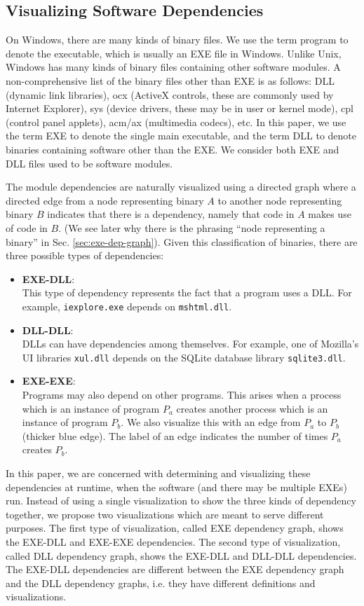 \subsection{Visualizing Software Dependencies}

On Windows, there are many kinds of binary files.
We use the term program to denote the executable, which
is usually an EXE file in Windows.
Unlike Unix, Windows has many kinds of binary files containing 
other software modules.
A non-comprehensive list of the binary files other than EXE
is as follows: 
DLL (dynamic link libraries), ocx (ActiveX controls,
these are commonly used by Internet Explorer), sys (device
drivers, these may be in user or kernel mode), cpl (control panel applets), 
acm/ax (multimedia codecs), etc.
In this paper, we use the term EXE to denote the single main executable,
and the term DLL to denote binaries containing software other than the EXE.
We consider both EXE and DLL files used to be software modules.

The module dependencies are naturally visualized using a directed graph where
a directed edge from a node representing binary $A$ to another 
node representing binary $B$ indicates that there is
a dependency, namely that code in $A$ makes use of code in $B$.
(We see later why there is the phrasing ``node representing a binary'' in
Sec. \ref{sec:exe-dep-graph}).
Given this classification of binaries, there are three possible
types of dependencies:
\begin{itemize}
\item {\bf EXE-DLL}: \\
This type of dependency represents the fact that a program uses a DLL.
For example, {\tt iexplore.exe} depends on {\tt mshtml.dll}.
\item {\bf DLL-DLL}: \\
DLLs can have dependencies among themselves.
For example, one of Mozilla's UI libraries {\tt xul.dll} depends on the SQLite
database library {\tt sqlite3.dll}.
\item {\bf EXE-EXE}: \\
Programs may also depend on other programs. This arises when a process
which is an instance of program $P_a$ creates another process 
which is an instance of program $P_b$.
We also visualize this with an edge from $P_a$ to $P_b$ (thicker blue edge).
The label of an edge indicates the number of times $P_a$ creates $P_b$.
\end{itemize}

In this paper, we are concerned with determining and visualizing these
dependencies at runtime, when the software (and there may be multiple
EXEs) run.
Instead of using a single visualization to show the three kinds of dependency
together, we propose two visualizations which are meant
to serve different purposes.
The first type of visualization, called EXE dependency graph,
shows the EXE-DLL and EXE-EXE dependencies.
The second type of visualization, called DLL dependency graph,
shows the EXE-DLL and DLL-DLL dependencies.
The EXE-DLL dependencies are different between the EXE dependency
graph and the DLL dependency graphs, i.e. they have different definitions
and visualizations.

